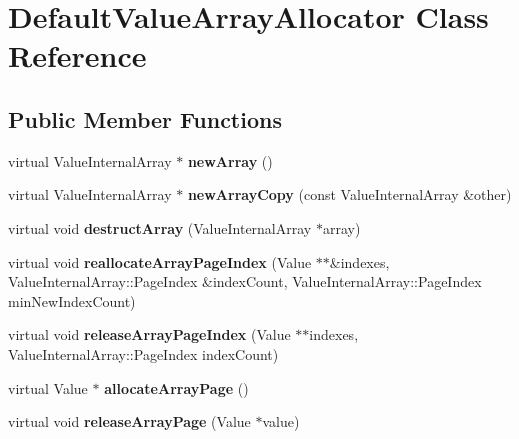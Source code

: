 \hypertarget{class_default_value_array_allocator}{\section{Default\-Value\-Array\-Allocator Class Reference}
\label{class_default_value_array_allocator}
}
\subsection*{Public Member Functions}
\begin{DoxyCompactItemize}
\item 
\hypertarget{class_default_value_array_allocator_a8689ed26ea893863259338c15d838b41}{virtual Value\-Internal\-Array $\ast$ {\bfseries new\-Array} ()}\label{class_default_value_array_allocator_a8689ed26ea893863259338c15d838b41}

\item 
\hypertarget{class_default_value_array_allocator_a2d56726cd560f97c3589026be8a65d95}{virtual Value\-Internal\-Array $\ast$ {\bfseries new\-Array\-Copy} (const Value\-Internal\-Array \&other)}\label{class_default_value_array_allocator_a2d56726cd560f97c3589026be8a65d95}

\item 
\hypertarget{class_default_value_array_allocator_adac32a54d25ee1aee7df3b19527ffb57}{virtual void {\bfseries destruct\-Array} (Value\-Internal\-Array $\ast$array)}\label{class_default_value_array_allocator_adac32a54d25ee1aee7df3b19527ffb57}

\item 
\hypertarget{class_default_value_array_allocator_a2a5376fbd5ac116ef985935e569d0492}{virtual void {\bfseries reallocate\-Array\-Page\-Index} (Value $\ast$$\ast$\&indexes, Value\-Internal\-Array\-::\-Page\-Index \&index\-Count, Value\-Internal\-Array\-::\-Page\-Index min\-New\-Index\-Count)}\label{class_default_value_array_allocator_a2a5376fbd5ac116ef985935e569d0492}

\item 
\hypertarget{class_default_value_array_allocator_a315ffaf5d7d8ca65c10f9468814866f4}{virtual void {\bfseries release\-Array\-Page\-Index} (Value $\ast$$\ast$indexes, Value\-Internal\-Array\-::\-Page\-Index index\-Count)}\label{class_default_value_array_allocator_a315ffaf5d7d8ca65c10f9468814866f4}

\item 
\hypertarget{class_default_value_array_allocator_a7b5bf432a9564dbfe5c1e8c38f54f64a}{virtual Value $\ast$ {\bfseries allocate\-Array\-Page} ()}\label{class_default_value_array_allocator_a7b5bf432a9564dbfe5c1e8c38f54f64a}

\item 
\hypertarget{class_default_value_array_allocator_a4f01eadeb6149a2417f8a7fff2e3ea6d}{virtual void {\bfseries release\-Array\-Page} (Value $\ast$value)}\label{class_default_value_array_allocator_a4f01eadeb6149a2417f8a7fff2e3ea6d}

\end{DoxyCompactItemize}


